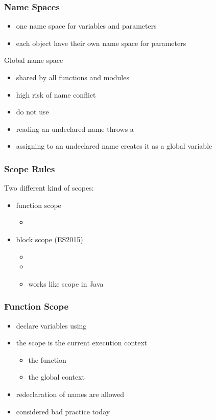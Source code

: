 \begin{frame}[fragile] \frametitle{Name Spaces}
\begin{itemize}
 \item one name space for variables and parameters
 \item each object have their own name space for parameters
\end{itemize}
\vspace{3mm}
Global name space
\begin{itemize}
  \item shared by all functions and modules
  \item high risk of name conflict
  \item do not use
\end{itemize}
\vspace{3mm}
\begin{itemize}
  \item reading an undeclared name throws a 
  \item assigning to an undeclared name creates it as a global variable
\end{itemize}
\end{frame}

\begin{frame}[fragile] \frametitle{Scope Rules}
Two different kind of scopes:
\begin{itemize}
  \item  function scope
  \begin{itemize}
    \item {}
  \end{itemize}
  \item block scope (ES2015)
  \begin{itemize}
    \item {}
    \item {}
    \item works like scope in Java
  \end{itemize}
\end{itemize}
\vspace{4mm}

\end{frame}

\begin{frame}[fragile] \frametitle{Function Scope}
\begin{itemize}
  \item declare variables using 
  \item the scope is the current execution context
  \begin{itemize}
    \item the function
    \item the global context
  \end{itemize}
  \item redeclaration of names are allowed
  \item considered bad practice today
\end{itemize}
\end{frame}


